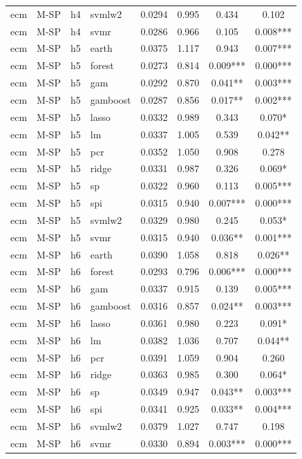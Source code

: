 \begin{ThreePartTable}
\begin{longtable}[t]{llclcccc}
ecm & M-SP & h4 & svmlw2 & 0.0294 & 0.995 & 0.434 & 0.102\\
ecm & M-SP & h4 & svmr & 0.0286 & 0.966 & 0.105 & 0.008***\\
\addlinespace
ecm & M-SP & h5 & earth & 0.0375 & 1.117 & 0.943 & 0.007***\\
ecm & M-SP & h5 & forest & 0.0273 & 0.814 & 0.009*** & 0.000***\\
ecm & M-SP & h5 & gam & 0.0292 & 0.870 & 0.041** & 0.003***\\
ecm & M-SP & h5 & gamboost & 0.0287 & 0.856 & 0.017** & 0.002***\\
ecm & M-SP & h5 & lasso & 0.0332 & 0.989 & 0.343 & 0.070*\\
ecm & M-SP & h5 & lm & 0.0337 & 1.005 & 0.539 & 0.042**\\
ecm & M-SP & h5 & pcr & 0.0352 & 1.050 & 0.908 & 0.278\\
ecm & M-SP & h5 & ridge & 0.0331 & 0.987 & 0.326 & 0.069*\\
ecm & M-SP & h5 & sp & 0.0322 & 0.960 & 0.113 & 0.005***\\
ecm & M-SP & h5 & spi & 0.0315 & 0.940 & 0.007*** & 0.000***\\
ecm & M-SP & h5 & svmlw2 & 0.0329 & 0.980 & 0.245 & 0.053*\\
ecm & M-SP & h5 & svmr & 0.0315 & 0.940 & 0.036** & 0.001***\\
\addlinespace
ecm & M-SP & h6 & earth & 0.0390 & 1.058 & 0.818 & 0.026**\\
ecm & M-SP & h6 & forest & 0.0293 & 0.796 & 0.006*** & 0.000***\\
ecm & M-SP & h6 & gam & 0.0337 & 0.915 & 0.139 & 0.005***\\
ecm & M-SP & h6 & gamboost & 0.0316 & 0.857 & 0.024** & 0.003***\\
ecm & M-SP & h6 & lasso & 0.0361 & 0.980 & 0.223 & 0.091*\\
ecm & M-SP & h6 & lm & 0.0382 & 1.036 & 0.707 & 0.044**\\
ecm & M-SP & h6 & pcr & 0.0391 & 1.059 & 0.904 & 0.260\\
ecm & M-SP & h6 & ridge & 0.0363 & 0.985 & 0.300 & 0.064*\\
ecm & M-SP & h6 & sp & 0.0349 & 0.947 & 0.043** & 0.003***\\
ecm & M-SP & h6 & spi & 0.0341 & 0.925 & 0.033** & 0.004***\\
ecm & M-SP & h6 & svmlw2 & 0.0379 & 1.027 & 0.747 & 0.198\\
ecm & M-SP & h6 & svmr & 0.0330 & 0.894 & 0.003*** & 0.000***\\

\end{longtable}
\end{ThreePartTable}
